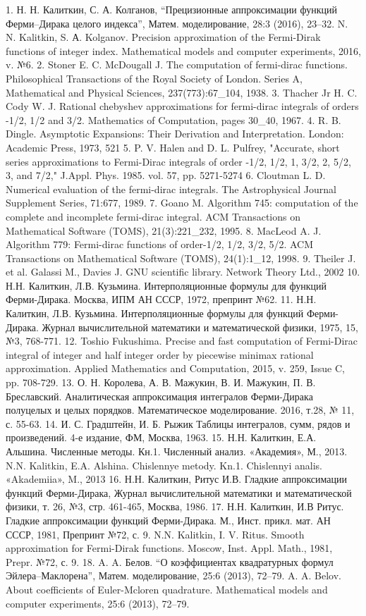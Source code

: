 1. Н. Н. Калиткин, С. А. Колганов, “Прецизионные аппроксимации
функций Ферми–Дирака целого индекса”, Матем. моделирование, 28:3
(2016), 23–32.
N. N. Kalitkin, S. А. Kolganov. Precision approximation of the Fermi-Dirak
functions of integer index. Mathematical models and computer experiments,
2016, v. №6.
2. Stoner E. C. McDougall J. The computation of fermi-dirac functions.
Philosophical Transactions of the Royal Society of London. Series A,
Mathematical and Physical Sciences, 237(773):67_104, 1938.
3. Thacher Jr H. C. Cody W. J. Rational chebyshev approximations for
fermi-dirac integrals of orders -1/2, 1/2 and 3/2. Mathematics of Computation,
pages 30_40, 1967.
4. R. B. Dingle. Asymptotic Expansions: Their Derivation and Interpretation.
London: Academic Press, 1973, 521
5. P. V. Halen and D. L. Pulfrey, "Accurate, short series approximations to
Fermi-Dirac integrals of order -1/2, 1/2, 1, 3/2, 2, 5/2, 3, and 7/2," J.Appl.
Phys. 1985. vol. 57, pp. 5271-5274
6. Cloutman L. D. Numerical evaluation of the fermi-dirac integrals. The
Astrophysical Journal Supplement Series, 71:677, 1989.
7. Goano M. Algorithm 745: computation of the complete and incomplete
fermi-dirac integral. ACM Transactions on Mathematical Software (TOMS),
21(3):221_232, 1995.
8. MacLeod A. J. Algorithm 779: Fermi-dirac functions of order-1/2, 1/2, 3/2,
5/2. ACM Transactions on Mathematical Software (TOMS), 24(1):1_12,
1998.
9. Theiler J. et al. Galassi M., Davies J. GNU scientific library. Network Theory
Ltd., 2002
10. Н.Н. Калиткин, Л.В. Кузьмина. Интерполяционные формулы для
функций Ферми-Дирака. Москва, ИПМ АН СССР, 1972, препринт №62.
11. Н.Н. Калиткин, Л.В. Кузьмина. Интерполяционные формулы для
функций Ферми-Дирака. Журнал вычислительной математики и
математической физики, 1975, 15, №3, 768-771.
12. Toshio Fukushima. Precise and fast computation of Fermi-Dirac integral of
integer and half integer order by piecewise minimax rational approximation.
Applied Mathematics and Computation, 2015, v. 259, Issue C, pp. 708-729.
13. О. Н. Королева, А. В. Мажукин, В. И. Мажукин, П. В. Бреславский.
Аналитическая аппроксимация интегралов Ферми-Дирака полуцелых и
целых порядков. Математическое моделирование. 2016, т.28, № 11, с.
55-63.
14. И. С. Градштейн, И. Б. Рыжик Таблицы интегралов, сумм, рядов и
произведений. 4-е издание, ФМ, Москва, 1963.
15. Н.Н. Калиткин, Е.А. Альшина. Численные методы. Кн.1. Численный
анализ. «Академия», М., 2013. N.N. Kalitkin, E.A.
Alshina. Chislennye metody. Kn.1. Chislennyi analis. «Akademiia», M., 2013
16. Н.Н. Калиткин, Ритус И.В. Гладкие аппроксимации функций
Ферми-Дирака, Журнал вычислительной математики и математической
физики, т. 26, №3, стр. 461-465, Москва, 1986.
17. Н.Н. Калиткин, И.В Ритус. Гладкие аппроксимации функций
Ферми-Дирака. М., Инст. прикл. мат. АН СССР, 1981, Препринт №72,
с. 9.
N.N. Kalitkin, I. V. Ritus. Smooth approximation for Fermi-Dirak functions.
Moscow, Inst. Appl. Math., 1981, Prepr. №72, с. 9.
18. A. A. Белов. “О коэффициентах квадратурных формул
Эйлера–Маклорена”, Матем. моделирование, 25:6 (2013), 72–79.
A. A. Belov. About coefficients of Euler-Mcloren quadrature. Mathematical
models and computer experiments, 25:6 (2013), 72–79.


